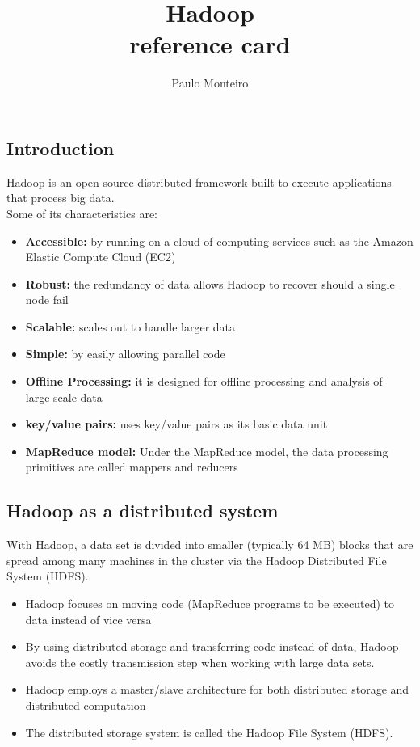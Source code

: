 \documentclass{article}
\title{
  \textbf{Hadoop}\\
  \Large{reference card}
}
\author{Paulo Monteiro}
\begin{document}
\begin{multicols}{2}
\maketitle



\section{Introduction}
Hadoop is an open source distributed framework built to execute applications that process big data. \\
Some of its characteristics are:
\begin{itemize}
\item \textbf{Accessible:} by running on a cloud of computing services such as the Amazon Elastic Compute Cloud (EC2)
\item \textbf{Robust:} the redundancy of data allows Hadoop to recover should a single node fail
\item \textbf{Scalable:} scales out to handle larger data
\item \textbf{Simple:} by easily allowing parallel code
\item \textbf{Offline Processing:} it is designed for offline processing and analysis of large-scale data 
\item \textbf{key/value pairs:} uses key/value pairs as its basic data unit
\item \textbf{MapReduce model:} Under the MapReduce model, the data processing primitives are called mappers and reducers
\end{itemize}

\subsection{Hadoop as a distributed system}

With Hadoop, a data set is divided into smaller (typically 64 MB) blocks that are spread among many machines in the cluster via the Hadoop Distributed File System (HDFS). 
\begin{itemize}
\item Hadoop focuses on moving code (MapReduce programs to be executed) to data instead of vice versa 
\item By using distributed storage and transferring code instead of data, Hadoop avoids the costly transmission step when working with large data sets.
\item Hadoop employs a master/slave architecture for both distributed storage and distributed computation 
\item The distributed storage system is called the Hadoop File System (HDFS). 
\end{itemize}


\end{multicols}
\end{document}
